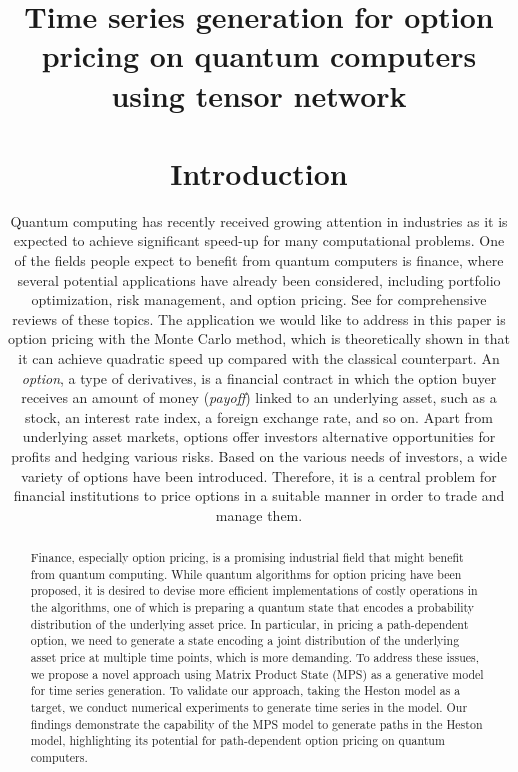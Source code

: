 
\title{\textbf{Time series generation for option pricing on quantum computers using tensor network}
\maketitle

\begin{abstract}

Finance, especially option pricing, is a promising industrial field that might benefit from quantum computing.
While quantum algorithms for option pricing have been proposed, it is desired to devise more efficient implementations of costly operations in the algorithms, one of which is preparing a quantum state that encodes a probability distribution of the underlying asset price.
In particular, in pricing a path-dependent option, we need to generate a state encoding a joint distribution of the underlying asset price at multiple time points, which is more demanding.
To address these issues, we propose a novel approach using Matrix Product State (MPS) as a generative model for time series generation.
To validate our approach, taking the Heston model as a target, we conduct numerical experiments to generate time series in the model.
Our findings demonstrate the capability of the MPS model to generate paths in the Heston model, highlighting its potential for path-dependent option pricing on quantum computers.
\end{abstract}

\section{Introduction} \label{sec:introduction}
Quantum computing has recently received growing attention in industries as it is expected to achieve significant speed-up for many computational problems.
One of the fields people expect to benefit from quantum computers is finance, where several potential applications have already been considered, including portfolio optimization, risk management, and option pricing. 
See \cite{orus2019quantum,bouland2020prospects,egger2020quantum,herman2022survey,herman2023quantum} for comprehensive reviews of these topics.
The application we would like to address in this paper is option pricing with the Monte Carlo method, which is theoretically shown in \cite{montanaro2015quantum} that it can achieve quadratic speed up compared with the classical counterpart.
An {\it option}, a type of derivatives, is a financial contract in which the option buyer receives an amount of money ({\it payoff}) linked to an underlying asset, such as a stock, an interest rate index, a foreign exchange rate, and so on.
Apart from underlying asset markets, options offer investors alternative opportunities for profits and hedging various risks.
Based on the various needs of investors, a wide variety of options have been introduced.
Therefore, it is a central problem for financial institutions to price options in a suitable manner in order to trade and manage them.

}
